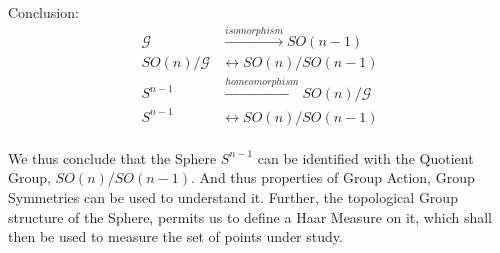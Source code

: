 \documentclass[11pt]{article}
\begin{document}
\hrulefill

Conclusion: 
\begin{align*}
\mathcal{G} &\xrightarrow{isomorphism} SO(n-1)\\
SO(n)/\mathcal{G} &\leftrightarrow SO(n)/SO(n-1)\\
S^{n-1} &\xrightarrow{homeomorphism} SO(n)/\mathcal{G}\\ 
S^{n-1} &\leftrightarrow SO(n)/SO(n-1)\\
\end{align*}

We thus conclude that the Sphere $S^{n-1}$ can be identified with the Quotient Group, $SO(n)/SO(n-1)$. And thus properties of Group Action, Group Symmetries can be used to understand it. Further, the topological Group structure of the Sphere, permits us to define a Haar Measure on it, which shall then be used to measure the set of points under study.

\hrulefill

\hrulefill
\end{document}
